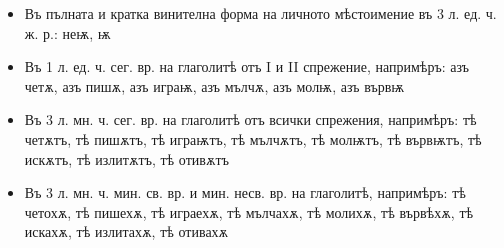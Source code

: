 \documentclass{article}
\begin{document}
\begin{itemize}
	\item Въ пълната и кратка винителна форма на личното мѣстоимение въ 3 л. ед. ч. ж. р.: неѭ, ѭ

	\item Въ 1 л. ед. ч. сег. вр. на глаголитѣ отъ I и II спрежение, напримѣръ: азъ четѫ, азъ пишѫ, азъ играѭ, азъ мълчѫ, азъ молѭ, азъ вървѭ

	\item Въ 3 л. мн. ч. сег. вр. на глаголитѣ отъ всички спрежения, напримѣръ: тѣ четѫтъ, тѣ пишѫтъ, тѣ играѭтъ, тѣ мълчѫтъ, тѣ молѭтъ, тѣ вървѭтъ, тѣ искѫтъ, тѣ излитѫтъ, тѣ отивѫтъ

	\item Въ 3 л. мн. ч. мин. св. вр. и мин. несв. вр. на глаголитѣ, напримѣръ: тѣ четохѫ, тѣ пишехѫ, тѣ играехѫ, тѣ мълчахѫ, тѣ молихѫ, тѣ вървѣхѫ, тѣ искахѫ, тѣ излитахѫ, тѣ отивахѫ
\end{itemize}

 
\end{document}
